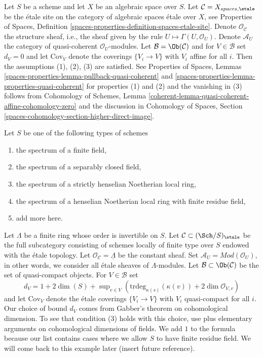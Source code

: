 \begin{example}
\label{example-quasi-coherent-spaces-etale}
Let $S$ be a scheme and let $X$ be an algebraic space over $S$.
Let $\mathcal{C} = X_{spaces, \etale}$ be the \'etale site
on the category of algebraic spaces \'etale over $X$, see
Properties of Spaces, Definition
\ref{spaces-properties-definition-spaces-etale-site}.
Denote $\mathcal{O}_\mathcal{C}$ the structure sheaf, i.e., the
sheaf given by the rule $U \mapsto \Gamma(U, \mathcal{O}_U)$.
Denote $\mathcal{A}_U$ the category of quasi-coherent $\mathcal{O}_U$-modules.
Let $\mathcal{B} = \Ob(\mathcal{C})$ and for $V \in \mathcal{B}$
set $d_V = 0$ and let $\text{Cov}_V$ denote
the coverings $\{V_i \to V\}$ with $V_i$ affine for all $i$.
Then the assumptions (1), (2), (3) are satisfied.
See Properties of Spaces, Lemmas
\ref{spaces-properties-lemma-pullback-quasi-coherent} and
\ref{spaces-properties-lemma-properties-quasi-coherent}
for properties (1) and (2) and the vanishing in (3) follows from
Cohomology of Schemes, Lemma
\ref{coherent-lemma-quasi-coherent-affine-cohomology-zero}
and the discussion in Cohomology of Spaces, Section
\ref{spaces-cohomology-section-higher-direct-image}.
\end{example}

\begin{example}
\label{example-etale}
Let $S$ be one of the following types of schemes
\begin{enumerate}
\item the spectrum of a finite field,
\item the spectrum of a separably closed field,
\item the spectrum of a strictly henselian Noetherian local ring,
\item the spectrum of a henselian Noetherian local ring with
finite residue field,
\item add more here.
\end{enumerate}
Let $\Lambda$ be a finite ring whose order is invertible on $S$.
Let $\mathcal{C} \subset (\Sch/S)_\etale$
be the full subcategory consisting of schemes locally of finite
type over $S$ endowed with the \'etale topology.
Let $\mathcal{O}_\mathcal{C} = \underline{\Lambda}$ be the
constant sheaf. Set $\mathcal{A}_U = \textit{Mod}(\mathcal{O}_U)$,
in other words, we consider all \'etale sheaves of $\Lambda$-modules.
Let $\mathcal{B} \subset \Ob(\mathcal{C})$
be the set of quasi-compact objects. For $V \in \mathcal{B}$ set
$$
d_V = 1 + 2\dim(S) +
\sup\nolimits_{v \in V}(\text{trdeg}_{\kappa(s)}(\kappa(v)) +
2 \dim \mathcal{O}_{V, v})
$$
and let $\text{Cov}_V$ denote the \'etale coverings $\{V_i \to V\}$
with $V_i$ quasi-compact for all $i$.
Our choice of bound $d_V$ comes from Gabber's theorem
on cohomological dimension. To see that condition (3)
holds with this choice, use 
\cite[Expos\'e VIII-A, Corollary 1.2 and Lemma 2.2]{Traveaux}
plus elementary arguments on cohomological dimensions of fields.
We add $1$ to the formula because our list contains cases where we allow $S$
to have finite residue field.
We will come back to this example later (insert future reference).
\end{example}


